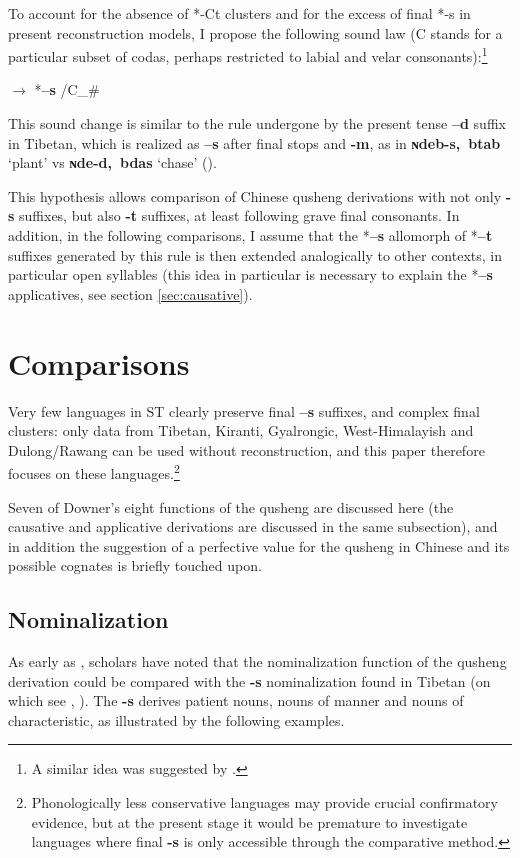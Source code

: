 \documentclass[oneside,a4paper,11pt]{article}
\newcommand{\ipa}[1]{{\phon\textbf{\mbox{#1}}}}
\begin{document}
To account for the absence of *-Ct clusters and for the excess of final *-s in present reconstruction models, I propose the following sound law (C stands for a particular subset of codas, perhaps restricted to labial and velar consonants):\footnote{A similar idea was suggested by \citet[42]{schuessler07}.}

\begin{exe}
\ex \label{ex:ts}
\glt *\ipa{--t} $\rightarrow$ *\ipa{--s} /C\_\# 
\end{exe}

This sound change is similar to the rule undergone by the present tense \ipa{--d} suffix in Tibetan, which is realized as \ipa{--s} after final stops and \ipa{-m}, as in \ipa{ɴdeb-s, btab}   `plant' vs \ipa{ɴde-d, bdas}   `chase' (\citealt[52-53]{coblin76}). 

This hypothesis allows comparison of Chinese qusheng derivations with not only \ipa{-s} suffixes, but also \ipa{-t} suffixes, at least following grave final consonants. In addition, in the following comparisons, I assume that the *\ipa{--s} allomorph of *\ipa{--t} suffixes generated by this rule is then extended analogically to other contexts, in particular open syllables (this idea in particular is necessary to explain the *\ipa{--s} applicatives, see section \ref{sec:causative}).


\section{Comparisons}

Very few languages in ST clearly preserve final \ipa{--s} suffixes, and complex final clusters: only data from Tibetan, Kiranti, Gyalrongic, West-Himalayish and Dulong/Rawang can be used without reconstruction, and this paper therefore focuses on these languages.\footnote{Phonologically less conservative languages may provide crucial confirmatory evidence, but at the present stage it would be premature to investigate languages where final \ipa{-s} is only accessible through the comparative method. }

Seven of Downer's eight functions of the qusheng are discussed here (the causative and applicative derivations are discussed in the same subsection), and in addition the suggestion of a perfective value for the qusheng in Chinese and its possible cognates is briefly touched upon.

\subsection{Nominalization} \label{sec:nmlz}
As early as \citet{forrest60occlusives}, scholars have noted that the nominalization function of the qusheng derivation could be compared with the \ipa{-s} nominalization found in Tibetan (on which see \citealt[43]{conrady1896}, \citealt[624-5]{hill14derivational}). The \ipa{-s} derives patient nouns, nouns of manner and nouns of characteristic, as illustrated by the following examples. 
\end{document}
